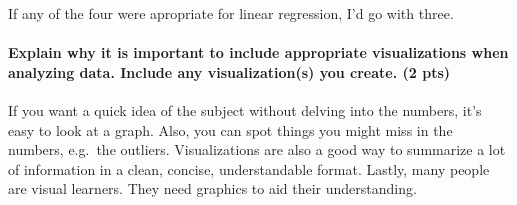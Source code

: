 \documentclass[]{article}
\let\oldparagraph\paragraph
\renewcommand{\paragraph}[1]{\oldparagraph{#1}\mbox{}}
\begin{document}
If any of the four were apropriate for linear regression, I'd go with
three.

\paragraph{Explain why it is important to include appropriate
visualizations when analyzing data. Include any visualization(s) you
create. (2
pts)}\label{explain-why-it-is-important-to-include-appropriate-visualizations-when-analyzing-data.-include-any-visualizations-you-create.-2-pts}

If you want a quick idea of the subject without delving into the
numbers, it's easy to look at a graph. Also, you can spot things you
might miss in the numbers, e.g.~the outliers. Visualizations are also a
good way to summarize a lot of information in a clean, concise,
understandable format. Lastly, many people are visual learners. They
need graphics to aid their understanding.
\end{document}

